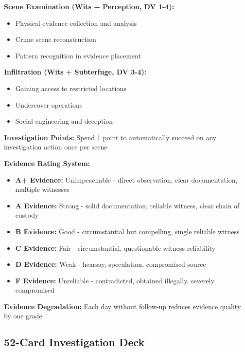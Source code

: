 \documentclass[11pt]{article}
\begin{document}
\textbf{Scene Examination (Wits + Perception, DV 1-4):}
\begin{itemize}
    \item Physical evidence collection and analysis
    \item Crime scene reconstruction
    \item Pattern recognition in evidence placement
\end{itemize}

\textbf{Infiltration (Wits + Subterfuge, DV 3-4):}
\begin{itemize}
    \item Gaining access to restricted locations
    \item Undercover operations
    \item Social engineering and deception
\end{itemize}

\textbf{Investigation Points:} Spend 1 point to automatically succeed on any investigation action once per scene

\textbf{Evidence Rating System:}
\begin{itemize}
    \item \textbf{A+ Evidence:} Unimpeachable - direct observation, clear documentation, multiple witnesses
    \item \textbf{A Evidence:} Strong - solid documentation, reliable witness, clear chain of custody
    \item \textbf{B Evidence:} Good - circumstantial but compelling, single reliable witness
    \item \textbf{C Evidence:} Fair - circumstantial, questionable witness reliability
    \item \textbf{D Evidence:} Weak - hearsay, speculation, compromised source
    \item \textbf{F Evidence:} Unreliable - contradicted, obtained illegally, severely compromised
\end{itemize}

\textbf{Evidence Degradation:} Each day without follow-up reduces evidence quality by one grade

\subsection{52-Card Investigation Deck}
\end{document}
